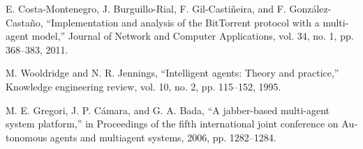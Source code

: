 \documentclass{article}
\begin{document}
\renewcommand*{\refname}{\section{منابع}}
\begin{thebibliography}{9}
\begin{latin}

E. Costa-Montenegro, J. Burguillo-Rial, F. Gil-Castiñeira, and F. González-Castaño, “Implementation and analysis of the BitTorrent protocol with a multi-agent model,” Journal of Network and Computer Applications, vol. 34, no. 1, pp. 368–383, 2011.

M. Wooldridge and N. R. Jennings, “Intelligent agents: Theory and practice,” Knowledge engineering review, vol. 10, no. 2, pp. 115–152, 1995.

M. E. Gregori, J. P. Cámara, and G. A. Bada, “A jabber-based multi-agent system platform,” in Proceedings of the fifth international joint conference on Autonomous agents and multiagent systems, 2006, pp. 1282–1284.

\end{latin}
\end{thebibliography}
\end{document}
